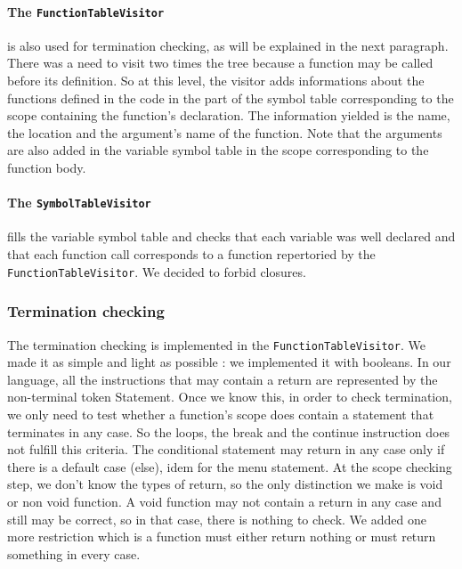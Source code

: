 \documentclass[a4paper,11pt]{article}
\begin{document}
\paragraph{The \texttt{FunctionTableVisitor}} is also used for termination checking, as will be explained in the next paragraph. There was a need to visit two times the tree because a function may be called before its definition. So at this level, the visitor adds informations about the functions defined in the code in the part of the symbol table corresponding to the scope containing the function's declaration. The information yielded is the name, the location and the argument's name of the function. Note that the arguments are also added in the variable symbol table in the scope corresponding to the function body.

\paragraph{The \texttt{SymbolTableVisitor}} fills the variable symbol table and checks that each variable was well declared and that each function call corresponds to a function repertoried by the \texttt{FunctionTableVisitor}. We decided to forbid closures.  
\subsubsection{Termination checking}
The termination checking is implemented in the \texttt{FunctionTableVisitor}. We made it as simple and light as possible : we implemented it with booleans. In our language, all the instructions that may contain a return are represented by the non-terminal token Statement. Once we know this, in order to check termination, we only need to test whether a function's scope does contain a statement that terminates in any case. So the loops, the break and the continue instruction does not fulfill this criteria. The conditional statement may return in any case only if there is a default case (else), idem for the menu statement. At the scope checking step, we don't know the types of return, so the only distinction we make is void or non void function. A void function may not contain a return in any case and still may be correct, so in that case, there is nothing to check. We added one more restriction which is a function must either return nothing or must return something in every case. 
\end{document}
